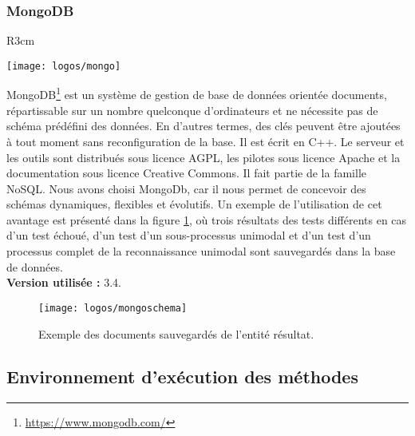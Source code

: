 \subsubsection{MongoDB}
\begin{wrapfigure}{R}{3cm}	\vspace{-20px}
	
	\texttt{[image: logos/mongo]}
\end{wrapfigure} 
MongoDB\footnote{\href{https://www.mongodb.com/}{https://www.mongodb.com/}} est un système de gestion de base de données orientée documents, répartissable sur un nombre quelconque d'ordinateurs et ne nécessite pas de schéma prédéfini des données. En d'autres termes, des clés peuvent être ajoutées à tout moment sans reconfiguration de la base. Il est écrit en C++. Le serveur et les outils sont distribués sous licence AGPL, les pilotes sous licence Apache et la documentation sous licence Creative Commons. Il fait partie de la famille NoSQL. Nous avons choisi MongoDb, car il nous permet de concevoir des schémas dynamiques, flexibles et évolutifs. Un exemple de l'utilisation de cet avantage est présenté dans la figure \ref{fig:mongoschema}, où trois résultats des tests différents en cas d'un test échoué, d'un test d'un sous-processus unimodal et d'un test d'un processus complet de la reconnaissance unimodal sont sauvegardés dans la base de données. \\
\textbf{Version utilisée :} 3.4.
\begin{figure}[H]
	\centering
	\texttt{[image: logos/mongoschema]}
	\caption{Exemple des documents sauvegardés de l'entité résultat.}
	\label{fig:mongoschema}
\end{figure}
\subsection{Environnement d'exécution des méthodes}	
